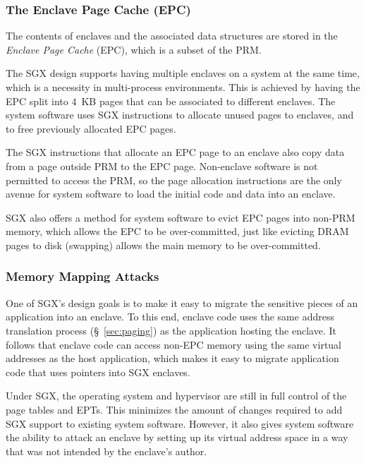 \subsubsection{The Enclave Page Cache (EPC)}
\label{sec:epc}


The contents of enclaves and the associated data structures are stored in the
\textit{Enclave Page Cache} (EPC), which is a subset of the PRM.

The SGX design supports having multiple enclaves on a system at the same time,
which is a  necessity in multi-process environments. This is achieved by having
the EPC split into 4~KB pages that can be associated to different enclaves. The
system software uses SGX instructions to allocate unused pages to enclaves, and
to free previously allocated EPC pages.

The SGX instructions that allocate an EPC page to an enclave also copy data
from a page outside PRM to the EPC page. Non-enclave software is not permitted
to access the PRM, so the page allocation instructions are the only avenue for
system software to load the initial code and data into an enclave.

SGX also offers a method for system software to evict EPC pages into non-PRM
memory, which allows the EPC to be over-committed, just like evicting DRAM
pages to disk (swapping) allows the main memory to be over-committed.


\subsubsection{Memory Mapping Attacks}
\label{sec:mapping_attacks}


One of SGX's design goals is to make it easy to migrate the sensitive pieces of
an application into an enclave. To this end, enclave code uses the same address
translation process (\S~\ref{sec:paging}) as the application hosting the
enclave. It follows that enclave code can access non-EPC memory using the same
virtual addresses as the host application, which makes it easy to migrate
application code that uses pointers into SGX enclaves.


Under SGX, the operating system and hypervisor are still in full control of the
page tables and EPTs. This minimizes the amount of changes required to add SGX
support to existing system software. However, it also gives system software the
ability to attack an enclave by setting up its virtual address space in a way
that was not intended by the enclave's author.

